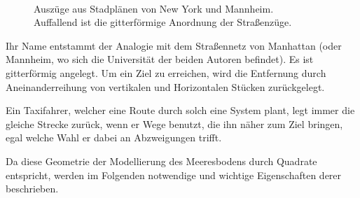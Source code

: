 \documentclass{article}
\begin{document}
\begin{figure}[!ht]
  \centering
  \qquad
  \\
  \caption{Auszüge aus Stadplänen von New York und Mannheim. \\ Auffallend ist die gitterförmige
  Anordnung der Straßenzüge. }
  \label{fig:tess_hexagon}
\end{figure}

Ihr Name entstammt der Analogie mit dem Straßennetz von Manhattan (oder Mannheim, wo sich
die Universität der beiden Autoren befindet). Es ist gitterförmig angelegt. Um ein Ziel zu erreichen,
wird die Entfernung durch Aneinanderreihung von vertikalen und Horizontalen Stücken zurückgelegt.

Ein Taxifahrer, welcher eine Route durch solch eine System plant, legt immer die gleiche 
Strecke zurück, wenn er Wege benutzt, die ihn näher zum Ziel bringen, egal welche Wahl er dabei 
an Abzweigungen trifft.

Da diese Geometrie der Modellierung des Meeresbodens durch Quadrate entspricht, werden im Folgenden
notwendige und wichtige Eigenschaften derer beschrieben.
\end{document}
